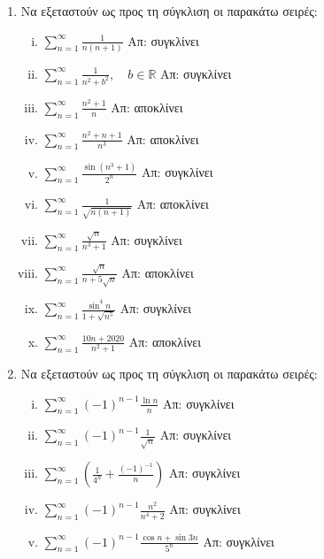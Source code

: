 



\geometry{top=2cm}
\everymath{\displaystyle}
\pagestyle{askhseis}




\begin{center}
  \minibox{\large \bfseries \textcolor{Col1}{Ασκήσεις στις Σειρές}}
\end{center}

\vspace{\baselineskip}

\begin{enumerate}
  \item Να εξεταστούν ως προς τη σύγκλιση οι παρακάτω σειρές: 
    \begin{enumerate}[i)]
      \item $ \sum_{n=1}^{\infty} \frac{1}{n(n+1)} $ \hfill Απ: συγκλίνει 
      \item $ \sum_{n=1}^{\infty} \frac{1}{n^{2}+b^{2}}, \quad b \in \mathbb{R} $ 
        \hfill Απ: συγκλίνει 
      \item $ \sum_{n=1}^{\infty} \frac{n^{2}+1}{n} $ \hfill Απ: αποκλίνει 
      \item $ \sum_{n=1}^{\infty} \frac{n^{2}+n+1}{n^{3}} $ \hfill Απ: αποκλίνει 
      \item $ \sum_{n=1}^{\infty} \frac{\sin{(n^{3}+1)}}{2^{n}} $ \hfill Απ: συγκλίνει 
      \item $ \sum_{n=1}^{\infty} \frac{1}{\sqrt{n(n+1)}} $ \hfill Απ: αποκλίνει 
      \item $ \sum_{n=1}^{\infty} \frac{\sqrt{n}}{n^{3}+1} $ \hfill Απ: συγκλίνει 
      \item $ \sum_{n=1}^{\infty} \frac{\sqrt{n}}{n+5 \sqrt{n}} $ \hfill Απ: αποκλίνει 
      \item $ \sum_{n=1}^{\infty} \frac{\sin^{4}{n}}{1+ \sqrt{n^{5}}} $ 
        \hfill Απ: συγκλίνει 
      \item $ \sum_{n=1}^{\infty} \frac{10n+2020}{n^{2}+1} $ \hfill Απ: αποκλίνει 
    \end{enumerate}

  \item Να εξεταστούν ως προς τη σύγκλιση οι παρακάτω σειρές: 
    \begin{enumerate}[i)]
      \item $ \sum_{n=1}^{\infty} (-1)^{n-1} \frac{\ln{n}}{n} $ \hfill Απ: συγκλίνει 
      \item $ \sum_{n=1}^{\infty} (-1)^{n-1} \frac{1}{\sqrt{n}} $ \hfill Απ: συγκλίνει 
      \item $ \sum_{n=1}^{\infty} \left(\frac{1}{4^{n}} + \frac{(-1)^{-1}}{n}\right) $ 
        \hfill Απ: συγκλίνει 
      \item $ \sum_{n=1}^{\infty} (-1)^{n-1} \frac{n^{2}}{n^{4}+2} $ 
        \hfill Απ: συγκλίνει 
      \item $ \sum_{n=1}^{\infty} (-1)^{n-1} \frac{\cos{n} + \sin{3n}}{5^{n}} $ 
        \hfill Απ: συγκλίνει
    \end{enumerate}
\end{enumerate}


